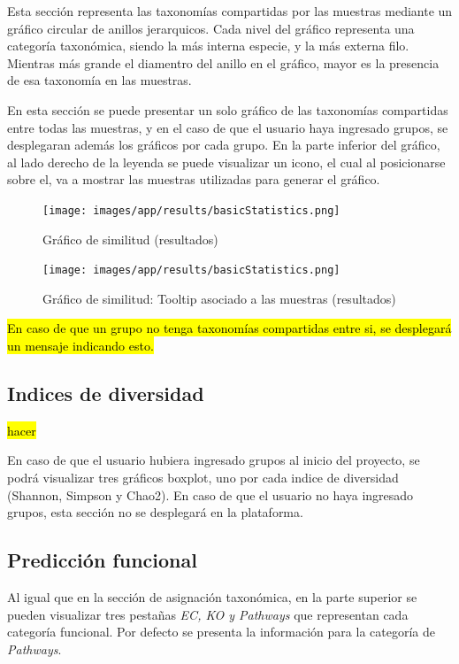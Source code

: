 Esta sección representa las taxonomías compartidas por las muestras mediante un gráfico circular de anillos jerarquicos. 
Cada nivel del gráfico representa una categoría taxonómica, siendo la más interna especie, y la más externa filo.
Mientras más grande el diamentro del anillo en el gráfico, mayor es la presencia de esa taxonomía en las muestras.

En esta sección se puede presentar un solo gráfico de las taxonomías compartidas entre todas las muestras, y en el caso de que el usuario haya ingresado grupos, se desplegaran además los gráficos por cada grupo.
En la parte inferior del gráfico, al lado derecho de la leyenda se puede visualizar un icono, el cual al posicionarse sobre el, va a mostrar las muestras utilizadas para generar el gráfico.

\begin{figure}[H]
    \texttt{[image: images/app/results/basicStatistics.png]}

    \caption{Gráfico de similitud  (resultados)}
    \label{fig:app-results-core}
\end{figure}

\begin{figure}[H]
    \texttt{[image: images/app/results/basicStatistics.png]}

    \caption{Gráfico de similitud: Tooltip asociado a las muestras (resultados)}
    \label{fig:app-results-core-tooltip}
\end{figure}

\hl{En caso de que un grupo no tenga taxonomías compartidas entre si, se desplegará un mensaje indicando esto.}
\subsection{Indices de diversidad}
\hl{hacer}

En caso de que el usuario hubiera ingresado grupos al inicio del proyecto, se podrá visualizar tres gráficos boxplot, uno por cada indice de diversidad (Shannon, Simpson y Chao2). En caso de que el usuario no haya ingresado grupos, esta sección no se desplegará en la plataforma.


\subsection{Predicción funcional}
Al igual que en la sección de asignación taxonómica, en la parte superior se pueden visualizar tres pestañas \textit{EC, KO y Pathways} que representan cada categoría funcional. Por defecto se presenta la información para la categoría de \textit{Pathways}.

